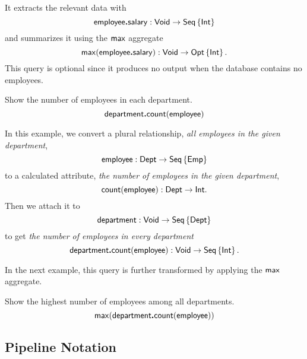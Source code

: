 It extracts the relevant data with
\begin{equation*}
    \Employee\To\Salary : \Void \to \Seq{\Int}
\end{equation*}
and summarizes it using the $\Max$ aggregate
\begin{equation*}
    \Max(\Employee\To\Salary) : \Void \to \Opt{\Int}.
\end{equation*}
This query is optional since it produces no output when the database contains
no employees.

\begin{demo}
    \label{ex:department-count-employee}
    Show the number of employees in each department.
    \begin{equation*}
        \Department\To\Count(\Employee)
    \end{equation*}
\end{demo}

In this example, we convert a plural relationship, \emph{all employees in the
given department},
\begin{equation*}
    \Employee : \Dept \to \Seq{\Emp}
\end{equation*}
to a calculated attribute, \emph{the number of employees in the given
department},
\begin{equation*}
    \Count(\Employee) : \Dept \to \Int.
\end{equation*}
Then we attach it to
\begin{equation*}
    \Department : \Void \to \Seq{\Dept}
\end{equation*}
to get \emph{the number of employees in every department}
\begin{equation*}
    \Department\To\Count(\Employee) : \Void \to \Seq{\Int}.
\end{equation*}

In the next example, this query is further transformed by applying the $\Max$
aggregate.

\begin{demo}
    \label{ex:max-department-count-employee}
    Show the highest number of employees among all departments.
    \begin{equation*}
        \Max(\Department\To\Count(\Employee))
    \end{equation*}
\end{demo}

\subsection*{Pipeline Notation}

